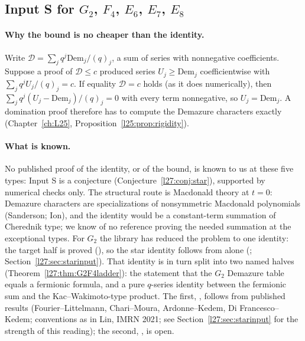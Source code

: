 \subsection{Input S for \texorpdfstring{$G_2$}{G2}, \texorpdfstring{$F_4$}{F4}, \texorpdfstring{$E_6$}{E6}, \texorpdfstring{$E_7$}{E7}, \texorpdfstring{$E_8$}{E8}}\label{l27:sec:starcore}

\paragraph{Why the bound is no cheaper than the identity.} Write $\mathcal D=\sum_jq^j\mathrm{Dem}_j/(q)_j$, a sum of series with nonnegative
coefficients. Suppose a proof of $\mathcal D\le c$ produced series $U_j\ge\mathrm{Dem}_j$ coefficientwise with $\sum_jq^jU_j/(q)_j=c$. If
equality $\mathcal D=c$ holds (as it does numerically), then $\sum_jq^j(U_j-\mathrm{Dem}_j)/(q)_j=0$ with every term nonnegative, so
$U_j=\mathrm{Dem}_j$. A domination proof therefore has to compute the Demazure characters exactly (Chapter~\ref{ch:L25},
Proposition~\ref{l25:prop:rigidity}).

\paragraph{What is known.} No published proof of the identity, or of the bound, is known to us at these five types: Input S is a
conjecture (Conjecture~\ref{l27:conj:star}), supported by numerical checks only. The structural route is Macdonald theory at $t=0$: Demazure characters are specializations of nonsymmetric
Macdonald polynomials (Sanderson; Ion), and the identity would be a constant-term summation of Cherednik type; we know of no reference
proving the needed summation at the exceptional types. For $G_2$ the library has reduced the problem to one identity: the target half
 is proved (), so the star identity follows from  alone
(; Section~\ref{l27:sec:starinput}). That identity is in turn split into two named halves
(Theorem~\ref{l27:thm:G2F4ladder}): the statement that the $G_2$ Demazure table equals a fermionic formula, and a pure $q$-series
identity between the fermionic sum and the Kac--Wakimoto-type product. The first, , follows from published results
(Fourier--Littelmann, Chari--Moura, Ardonne--Kedem, Di Francesco--Kedem; conventions as in Lin, IMRN 2021; see
Section~\ref{l27:sec:starinput} for the strength of this reading); the second, , is open.

